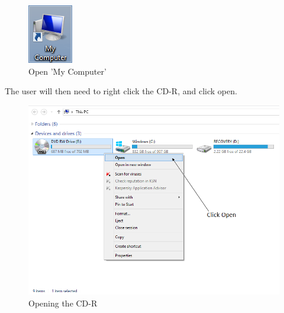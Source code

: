 \begin{figure}[H]
    \includegraphics[width=\textwidth]{./Manual/Installation/MyComputer.png}
    \caption{Open 'My Computer'}
\end{figure}

The user will then need to right click the CD-R, and click open.

\begin{figure}[H]
    \includegraphics[width=\textwidth]{./Manual/Installation/OpenCDR.png}
    \caption{Opening the CD-R}
\end{figure}

